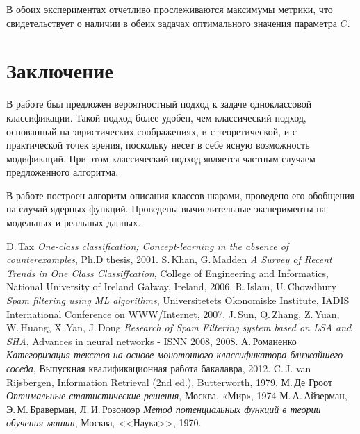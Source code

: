 \documentclass[12pt,a4paper]{article}
\begin{document}
	В обоих экспериментах отчетливо прослеживаются максимумы метрики, что свидетельствует о наличии в обеих задачах оптимального значения параметра $C.$


\section{Заключение}						
	В работе был предложен вероятностный подход к задаче одноклассовой классификации. Такой подход более удобен, чем классический подход, основанный на эвристических соображениях, и с теоретической, и с практической точек зрения, поскольку несет в себе ясную возможность модификаций. При этом классический подход является частным случаем предложенного алгоритма.

	В работе построен алгоритм описания классов шарами, проведено его обобщения на случай ядерных функций. Проведены вычислительные эксперименты на модельных и реальных данных.


\begin{thebibliography}{99}
	 D.\,Tax \textit{One-class classification; Concept-learning in the absence of
	counterexamples}, Ph.D thesis, 2001.
	 S.\,Khan, G.\,Madden \textit{A Survey of Recent Trends in One Class
	Classiffcation}, College of Engineering and Informatics, National University of Ireland Galway,
	Ireland, 2006.
	 R.\,Islam, U.\,Chowdhury \textit{Spam filtering using ML algorithms}, Universitetets Okonomiske Institute, IADIS International Conference on WWW/Internet, 2007.
	 J.\,Sun, Q.\,Zhang, Z.\,Yuan, W.\,Huang, X.\,Yan, J.\,Dong \textit{Research of Spam Filtering system based on LSA and SHA}, Advances in neural networks - ISNN 2008, 2008.
	 А.\,Романенко  \textit{Категоризация текстов на основе монотонного
	классификатора ближайшего соседа}, Выпускная квалификационная работа бакалавра, 2012.
	 C.\,J. van Rijsbergen, Information Retrieval (2nd ed.), Butterworth, 1979.
	М.\,Де Гроот \textit{Оптимальные статистические решения}, Москва, «Мир», 1974
	 М.\,А.\,Айзерман, Э.\,М.\,Браверман, Л.\,И.\,Розоноэр \textit{Метод потенциальных функций в теории обучения машин}, Москва, <<Наука>>, 1970.
\end{thebibliography}
\end{document}
